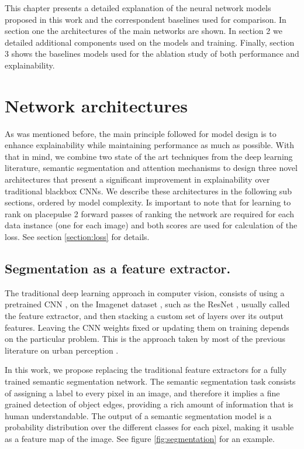 This chapter presents a detailed explanation of the neural network models proposed in this work and
the correspondent baselines used for comparison. In section one the architectures of
the main networks are shown. In section 2 we detailed additional components used on the models and training.
Finally, section 3 shows the baselines models
used for the ablation study of both performance and explainability.

\section{Network architectures}
As was mentioned before, the main principle followed for model design is to enhance explainability
while maintaining performance as much as possible. With that in mind, we combine two
state of the art techniques from the deep learning literature, semantic segmentation
and attention mechanisms to design three novel architectures that present a significant
improvement in explainability over traditional blackbox CNNs. We describe these architectures
in the following sub sections, ordered by model complexity. Is important to note that
for learning to rank on placepulse
2 forward passes of ranking the network are required for each data instance (one for each image) and both scores are used
for calculation of the loss. See section \ref{section:loss} for  details.


\subsection{Segmentation as a feature extractor.}
The traditional deep learning approach in computer vision, consists of using a pretrained
CNN \cite{lecun_mnist}, on the Imagenet dataset \cite{imagenet}, such as the ResNet \cite{he_resnet},
usually called the feature extractor, and then stacking a custom set of layers over its output features. Leaving the CNN weights
fixed or updating them on training  depends on the particular problem. This is the approach taken
by most of the previous literature on urban perception \cite{hidalgo_placepulse,tamara_judgments,zhang_measuring}.

In this work, we propose replacing the traditional feature extractors for a fully trained semantic segmentation
network. The semantic segmentation task consists of assigning a label to every pixel in an image, and therefore
it implies a fine grained detection of object edges, providing a rich amount of information that is human understandable.
The output of a semantic segmentation model is a probability distribution over the different classes for each pixel,
making it usable as a feature map of the image. See figure \ref{fig:segmentation} for an example.

